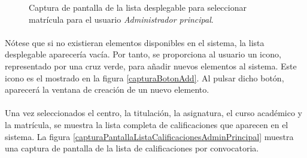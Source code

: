   \begin{figure}[!ht]
    \begin{center}
      \caption{Captura de pantalla de la lista desplegable para seleccionar matrícula para el usuario \textit{Administrador principal}.}
      \label{capturaPantallaSelectMatricula}
    \end{center}
  \end{figure}

  \paragraph{}Nótese que si no existieran elementos disponibles en el sistema,
  la lista desplegable aparecería vacía. Por tanto, se proporciona al usuario
  un icono, representado por una cruz verde, para añadir nuevos elementos al
  sistema. Este icono es el mostrado en la figura \ref{capturaBotonAdd}. Al
  pulsar dicho botón, aparecerá la ventana de creación de un nuevo elemento.

  \paragraph{}Una vez seleccionados el centro, la titulación, la asignatura,
  el curso académico y la matrícula, se muestra la lista completa de
  calificaciones que aparecen en el sistema. La figura
  \ref{capturaPantallaListaCalificacionesAdminPrincipal} muestra una captura de
  pantalla de la lista de calificaciones por convocatoria.

